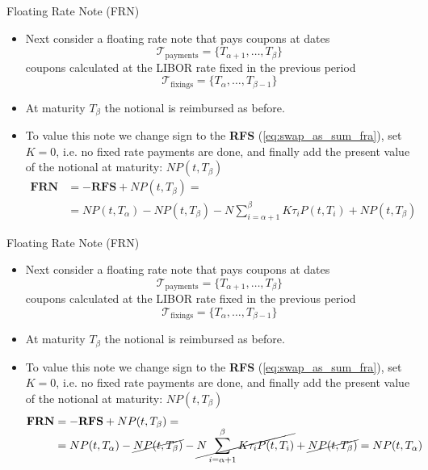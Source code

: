 \documentclass{beamer}
\begin{document}
\begin{frame}{Floating Rate Note (FRN)}
	\begin{itemize}
		\item<0-> Next consider a floating rate note that pays coupons at dates
		\begin{equation*}
			\mathcal{T}_{\text{payments}} = \{T_{\alpha+1},\ldots,T_\beta\}
		\end{equation*}
		coupons calculated at the LIBOR rate fixed in the previous period
		\begin{equation*}
			\mathcal{T}_{\text{fixings}} = \{T_{\alpha},\ldots,T_{\beta - 1}\}
		\end{equation*}
		\item<1-> At maturity $T_\beta$ the notional is reimbursed as before.
		\item<2-> To value this note we change sign to the \textbf{RFS} (\cref{eq:swap_as_sum_fra}), set $K=0$, i.e. no fixed rate payments are done, and finally add the present value of the notional at maturity: $NP(t,T_\beta)$
		\begin{equation*}
			\begin{aligned}
			\textbf{FRN} &= -\textbf{RFS} + NP(t,T_\beta) =\\
			& =NP(t,T_\alpha)-NP(t,T_\beta)-N\sum_{i=\alpha+1}^{\beta}K\tau_i P(t,T_i) + NP(t,T_\beta)
		\end{aligned}
		\end{equation*}
	\end{itemize}
\end{frame}

\begin{frame}{Floating Rate Note (FRN)}
	\begin{itemize}
		\item Next consider a floating rate note that pays coupons at dates
		\begin{equation*}
			\mathcal{T}_{\text{payments}} = \{T_{\alpha+1},\ldots,T_\beta\}
		\end{equation*}
		coupons calculated at the LIBOR rate fixed in the previous period
		\begin{equation*}
			\mathcal{T}_{\text{fixings}} = \{T_{\alpha},\ldots,T_{\beta - 1}\}
		\end{equation*}
		\item At maturity $T_\beta$ the notional is reimbursed as before.
		\item To value this note we change sign to the \textbf{RFS} (\cref{eq:swap_as_sum_fra}), set $K=0$, i.e. no fixed rate payments are done, and finally add the present value of the notional at maturity: $NP(t,T_\beta)$
		\begin{equation*}
		\begin{aligned}
			\textbf{FRN} &= -\textbf{RFS} + NP(t,T_\beta) =\\
			& =NP(t,T_\alpha)-\cancel{NP(t,T_\beta)}-\cancel{N\sum_{i=\alpha+1}^{\beta}K\tau_i P(t,T_i)} + \cancel{NP(t,T_\beta)} =NP(t,T_\alpha)
		\end{aligned}
		\end{equation*}
	\end{itemize}
\end{frame}
\end{document}
